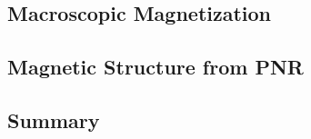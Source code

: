 \documentclass[\main/dresen_thesis.tex]{subfiles}
\renewcommand{\thisPath}{\main/chapters/doublelayers/magnetism}
\begin{document}
  

  \subsection{Macroscopic Magnetization}
  
    \FloatBarrier

  \subsection{Magnetic Structure from PNR}
  
    \FloatBarrier

  \subsection{Summary}
  
    \FloatBarrier
\end{document}
